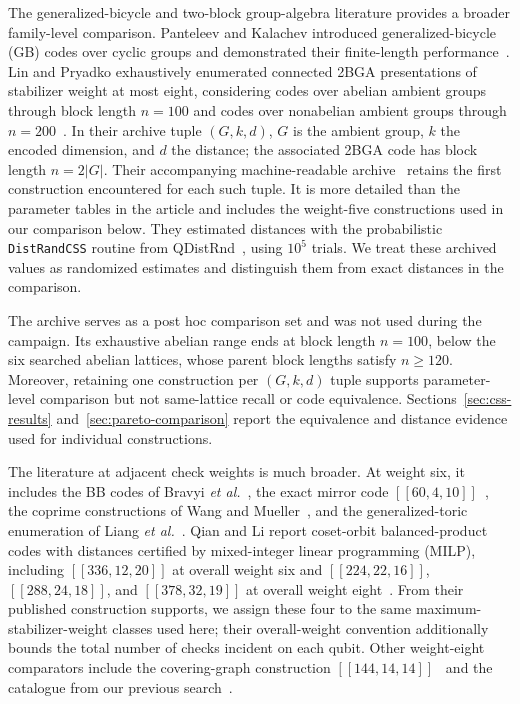 \documentclass[aps,prx,twocolumn,superscriptaddress,nofootinbib,floatfix]{revtex4-2}
\newcommand{\code}[1]{\ensuremath{\left[\!\left[#1\right]\!\right]}}
\begin{document}
The generalized-bicycle and two-block group-algebra literature provides a
broader family-level comparison.  Panteleev and
Kalachev introduced generalized-bicycle (GB) codes over cyclic groups and
demonstrated their finite-length performance~\cite{panteleev2021degenerate}.
Lin and Pryadko exhaustively enumerated connected 2BGA presentations of stabilizer
weight at most eight, considering codes over abelian ambient groups through
block length $n=100$ and codes over nonabelian ambient groups through
$n=200$~\cite{lin2024twoblock}.  In their archive tuple $(G,k,d)$, $G$ is the
ambient group, $k$ the encoded dimension, and $d$ the distance; the associated
2BGA code has block length $n=2|G|$.  Their
accompanying machine-readable archive~\cite{linpryadko2bgaarchive} retains the
first construction encountered for each such tuple.  It is more detailed than
the parameter tables in the article and includes the weight-five constructions
used in our comparison below.  They estimated distances with the probabilistic
\texttt{DistRandCSS} routine from QDistRnd~\cite{pryadko2022qdistrnd}, using
$10^5$ trials.  We treat these archived values as randomized estimates and
distinguish them from exact distances in the comparison.

The archive serves as a post hoc comparison set and was not used during the
campaign.  Its exhaustive abelian range ends at block length $n=100$, below
the six searched abelian lattices, whose parent block lengths satisfy
$n\geq120$.  Moreover, retaining
one construction per $(G,k,d)$ tuple supports parameter-level comparison but
not same-lattice recall or code equivalence.  Sections~\ref{sec:css-results}
and~\ref{sec:pareto-comparison} report the equivalence and distance evidence
used for individual constructions.

The literature at adjacent check weights is much broader.  At weight six, it
includes the BB codes of Bravyi \emph{et al.}~\cite{bravyi2024high}, the exact
mirror code $\code{60,4,10}$~\cite{khesin2026mirror}, the coprime constructions
of Wang and Mueller~\cite{wang2024coprime}, and the generalized-toric
enumeration of Liang \emph{et al.}~\cite{liang2025generalized}.  Qian and Li
report coset-orbit balanced-product codes with distances certified by
mixed-integer linear programming (MILP), including
$\code{336,12,20}$ at overall weight six and $\code{224,22,16}$,
$\code{288,24,18}$, and $\code{378,32,19}$ at overall weight
eight~\cite{qian2026multiagent}.  From their published construction supports,
we assign these four to the same maximum-stabilizer-weight classes used here;
their overall-weight convention additionally bounds the total number of checks
incident on each qubit.  Other weight-eight comparators include the
covering-graph construction $\code{144,14,14}$~\cite{symons2025sequences} and
the catalogue from our previous search~\cite{cruzbenito2026evolutionary}.
\end{document}
